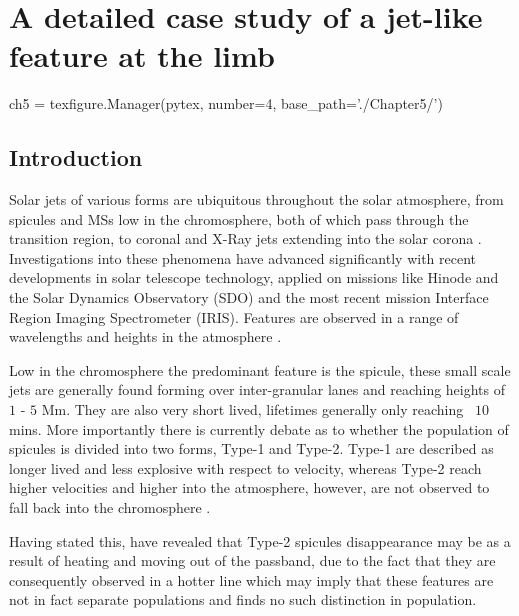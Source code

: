 


\chapter{A detailed case study of a jet-like feature at the limb}
\label{ch:5}
\begin{pycode}[chapter5]
ch5 = texfigure.Manager(pytex, number=4, base_path='./Chapter5/')
\end{pycode}

\section{Introduction}
Solar jets of various forms are ubiquitous throughout the solar atmosphere, from spicules and MSs low in the chromosphere, both of which pass through the transition region, to coronal and X-Ray jets extending into the solar corona \cite{Archontis2008,Majarska2011,Morton2012}. 
Investigations into these phenomena have advanced significantly with recent developments in solar telescope technology, applied on missions like Hinode and the Solar Dynamics Observatory (SDO) and the most recent mission Interface Region Imaging Spectrometer (IRIS).
Features are observed in a range of wavelengths and heights in the atmosphere \cite{Wang1998,Yamaucho2004}. 

Low in the chromosphere the predominant feature is the spicule, these small scale jets are generally found forming over inter-granular lanes and reaching heights of $1$ - $5$ Mm.
They are also very short lived, lifetimes generally only reaching ~$10$ mins.
More importantly there is currently debate as to whether the population of spicules is divided into two forms, Type-1 and Type-2. 
Type-1 are described as longer lived and less explosive with respect to velocity, whereas Type-2 reach higher velocities and higher into the atmosphere, however, are not observed to fall back into the chromosphere \cite{DePontieu2007,Beckers1972,Sterling2000}. 

Having stated this, \cite{Pereira2014} have revealed that Type-2 spicules disappearance may be as a result of heating and moving out of the passband, due to the fact that they are consequently observed in a hotter line which may imply that these features are not in fact separate populations and \cite{Zhang2012} finds no such distinction in population.

